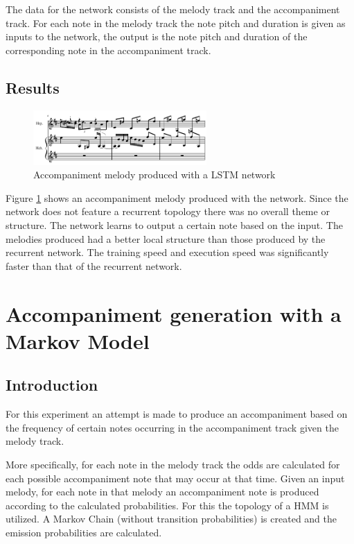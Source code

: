 The data for the network consists of the melody track and the accompaniment track. For each note in the melody track the note pitch and duration is given as inputs to the network, the output is the note pitch and duration of the corresponding note in the accompaniment track.

\section{Results}
\begin{figure}
\centerline{\includegraphics[width=250px]{../images/ann_ff_accomp.pdf}}
\caption{Accompaniment melody produced with a \ac{LSTM} network}
\label{ims:annffaccomp}
\end{figure}

Figure \ref{ims:annffaccomp} shows an accompaniment melody produced with the network.
Since the network does not feature a recurrent topology there was no overall theme or structure. The network learns to output a certain note based on the input. The melodies produced had a better local structure than those produced by the recurrent network. The training speed and execution speed was significantly faster than that of the recurrent network. 

\chapter{Accompaniment generation with a Markov Model}
\section{Introduction}
For this experiment an attempt is made to produce an accompaniment based on the frequency of certain notes occurring in the accompaniment track given the melody track.

More specifically, for each note in the melody track the odds are calculated for each possible accompaniment note that may occur at that time. Given an input melody, for each note in that melody an accompaniment note is produced according to the calculated probabilities. For this the topology of a \ac{HMM} is utilized. A Markov Chain (without transition probabilities) is created and the emission probabilities are calculated.

